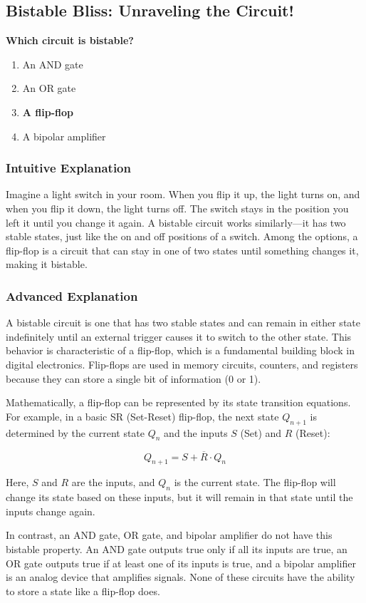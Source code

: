 \subsection{Bistable Bliss: Unraveling the Circuit!}

\begin{tcolorbox}[colback=gray!10!white,colframe=black!75!black,title=\textbf{E7A01}]
\textbf{Which circuit is bistable?}
\begin{enumerate}[label=\Alph*)]
    \item An AND gate
    \item An OR gate
    \item \textbf{A flip-flop}
    \item A bipolar amplifier
\end{enumerate}
\end{tcolorbox}

\subsubsection{Intuitive Explanation}
Imagine a light switch in your room. When you flip it up, the light turns on, and when you flip it down, the light turns off. The switch stays in the position you left it until you change it again. A bistable circuit works similarly—it has two stable states, just like the on and off positions of a switch. Among the options, a flip-flop is a circuit that can stay in one of two states until something changes it, making it bistable.

\subsubsection{Advanced Explanation}
A bistable circuit is one that has two stable states and can remain in either state indefinitely until an external trigger causes it to switch to the other state. This behavior is characteristic of a flip-flop, which is a fundamental building block in digital electronics. Flip-flops are used in memory circuits, counters, and registers because they can store a single bit of information (0 or 1).

Mathematically, a flip-flop can be represented by its state transition equations. For example, in a basic SR (Set-Reset) flip-flop, the next state \( Q_{n+1} \) is determined by the current state \( Q_n \) and the inputs \( S \) (Set) and \( R \) (Reset):

\[
Q_{n+1} = S + \overline{R} \cdot Q_n
\]

Here, \( S \) and \( R \) are the inputs, and \( Q_n \) is the current state. The flip-flop will change its state based on these inputs, but it will remain in that state until the inputs change again.

In contrast, an AND gate, OR gate, and bipolar amplifier do not have this bistable property. An AND gate outputs true only if all its inputs are true, an OR gate outputs true if at least one of its inputs is true, and a bipolar amplifier is an analog device that amplifies signals. None of these circuits have the ability to store a state like a flip-flop does.

